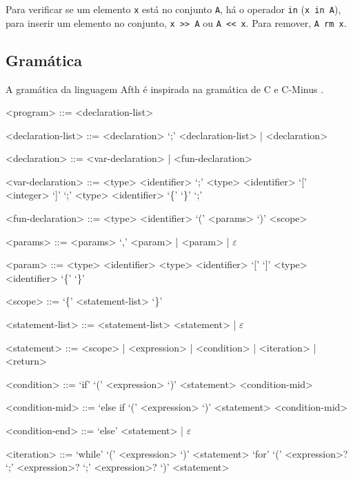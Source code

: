 \documentclass[
	article,			%
	11pt,				%
	oneside,			%
	a4paper,			%
	english,			%
	brazil,				%
	sumario=tradicional
	]{abntex2}
\begin{document}
Para verificar se um elemento \texttt{x} está no conjunto \texttt{A}, há o operador \texttt{in}
(\texttt{x in A}), para inserir um elemento no conjunto, \texttt{x >> A} ou \texttt{A << x}. Para
remover, \texttt{A rm x}.

\subsection{Gramática}

A gramática da linguagem Afth é inspirada na gramática de C
\cite[Seção A13]{Kernighan:1988:CPL:576122} e C-Minus \cite{BNFCM}.


\setlength{\grammarparsep}{0pt plus 1pt minus 1pt} %
\setlength{\grammarindent}{12em} %

\begin{grammar}
	
	<program> ::= <declaration-list>
		
	<declaration-list> ::= <declaration> `;' <declaration-list> | <declaration>
	
	<declaration> ::= <var-declaration> | <fun-declaration>
	
	<var-declaration> ::= <type> <identifier> `;'
	\alt <type> <identifier> `[' <integer> `]' `;'
	\alt <type> <identifier> `\{' `\}' `;'
	
	<fun-declaration> ::= <type> <identifier> `(' <params> `)' <scope>
		
	<params> ::= <params> `,' <param> | <param> | $\varepsilon$
	
	<param> ::= <type> <identifier>
	\alt <type> <identifier> `[' `]'
	\alt <type> <identifier> `\{' `\}'
	
	<scope> ::= `\{' <statement-list> `\}'
	
	<statement-list> ::= <statement-list> <statement> | $\varepsilon$
	
	<statement> ::= <scope> | <expression> | <condition> | <iteration> | <return>
	
	<condition> ::= `if' `(' <expression> `)' <statement> <condition-mid>
		
	<condition-mid> ::= `else if `(' <expression> `)' <statement> <condition-mid>
	\alt <condition-end>
	
	<condition-end> ::= `else' <statement> | $\varepsilon$
	
	<iteration> ::= `while' `(' <expression> `)' <statement>
	\alt `for' `(' <expression>? `;' <expression>? `;' <expression>? `)' <statement>
	

\end{grammar}
\end{document}
